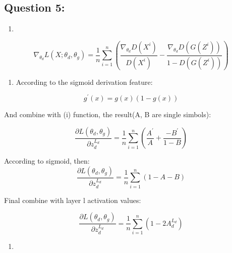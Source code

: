 \documentclass[11pt]{article}
\providecommand{\tightlist}{%
      \setlength{\itemsep}{0pt}\setlength{\parskip}{0pt}}
\begin{document}
    \hypertarget{question-5}{%
\subsection{Question 5:}\label{question-5}}

    \begin{enumerate}
\def\labelenumi{(\roman{enumi})}
\tightlist
\item
\end{enumerate}

\begin{equation}
\nabla_{\theta_{d}} L (X; \theta_d, \theta_g) = \frac{1}{n} \sum_{i=1}^{n} (\frac{\nabla_{\theta_d} D(X^i)}{D(X^i)} - \frac{\nabla_{\theta_d}D(G(Z^i))}{1 - D(G(Z^i))})
\end{equation}

    \begin{enumerate}
\def\labelenumi{(\roman{enumi})}
\setcounter{enumi}{1}
\tightlist
\item
  According to the sigmoid derivation feature:
\end{enumerate}

\begin{equation}
g^{'}(x) = g(x)(1-g(x))
\end{equation}

And combine with (i) function, the result(A, B are single simbols):

\begin{equation}
\frac{\partial L(\theta_d, \theta_g)}{\partial z_d^{L_d}} = \frac{1}{n} \sum_{i=1}^{n} (\frac{A^{'}}{A} + \frac{-B^{'}}{1-B})
\end{equation}

According to sigmoid, then: \begin{equation}
\frac{\partial L(\theta_d, \theta_g)}{\partial z_d^{L_d}} = \frac{1}{n} \sum_{i=1}^{n} (1 - A - B)
\end{equation}

Final combine with layer l activation values:

\begin{equation}
\frac{\partial L(\theta_d, \theta_g)}{\partial z_d^{L_d}} = \frac{1}{n} \sum_{i=1}^{n} (1 - 2A_d^{L_d})
\end{equation}

    \begin{enumerate}
\def\labelenumi{(\roman{enumi})}
\setcounter{enumi}{2}
\tightlist
\item
\end{enumerate}
\end{document}
